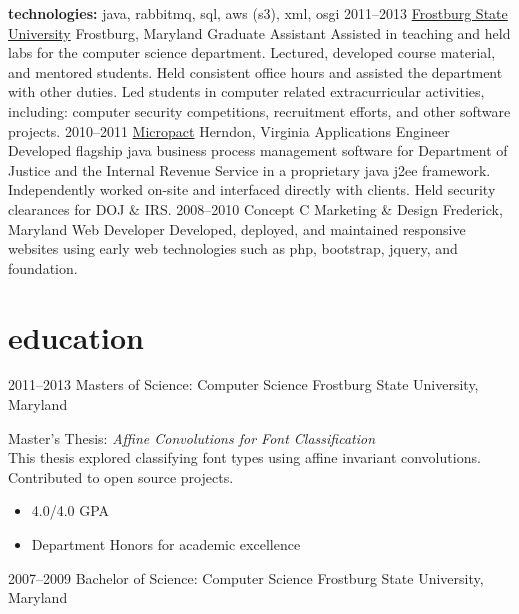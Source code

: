 \documentclass[]{friggeri-cv} %
\begin{document}
\begin{entrylist}
{	\textbf{technologies:} java, rabbitmq, sql, aws (s3), xml, osgi
}
\entry
{2011--2013}
{\href{http://www.frostburg.edu/}{Frostburg State University}}
{Frostburg, Maryland}
{Graduate Assistant}
{
	Assisted in teaching and held labs for the computer science department. Lectured, developed course material, and mentored students. Held consistent office hours and assisted the department with other duties. Led students in computer related extracurricular activities, including: computer security competitions, recruitment efforts, and other software projects.
}
\entry
{2010--2011}
{\href{https://www.micropact.com/}{Micropact}}
{Herndon, Virginia}
{Applications Engineer}
{
Developed flagship java business process management software for Department of Justice and the Internal Revenue Service in a proprietary java j2ee framework. Independently worked on-site and interfaced directly with clients. Held security clearances for DOJ \& IRS.
}
\entry
{2008--2010}
{Concept C Marketing \& Design}
{Frederick, Maryland}
{Web Developer}
{
	Developed, deployed, and maintained responsive websites using early web technologies such as php, bootstrap, jquery, and foundation.
}

\end{entrylist}

\section{education}

\begin{entrylist}
\entryFour
{2011--2013}
{Masters {\normalfont of Science: Computer Science}}
{Frostburg State University, Maryland}
{
Master's Thesis: \emph{Affine Convolutions for Font Classification} \\ This thesis explored classifying font types using affine invariant convolutions. \\
Contributed to open source projects.
	\begin{itemize}
	\item 4.0/4.0 GPA
	\item Department Honors for academic excellence 
	\end{itemize}
}
\entryFour
{2007--2009}
{Bachelor {\normalfont of Science: Computer Science}}
{Frostburg State University, Maryland}
{}

\end{entrylist}
\end{document}
